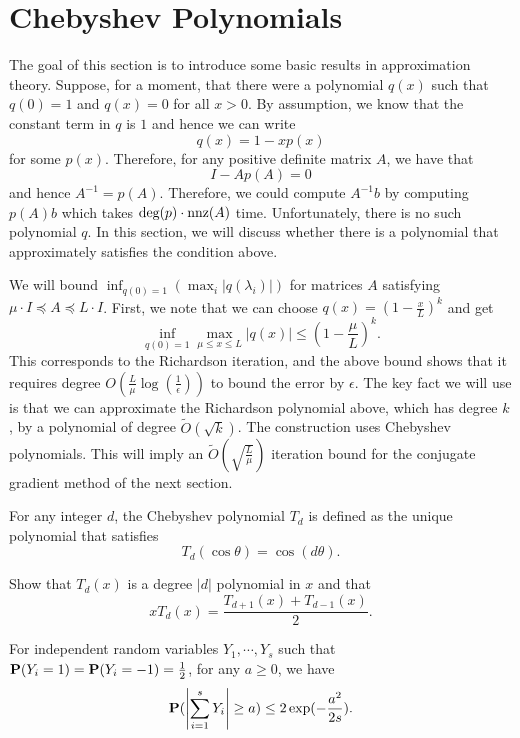 %

\section{Chebyshev Polynomials\label{sec:Chebyshev-Polynomials}}

The goal of this section is to introduce some basic results in approximation
theory. Suppose, for a moment, that there were a polynomial $q(x)$
such that $q(0)=1$ and $q(x)=0$ for all $x>0$. By assumption, we
know that the constant term in $q$ is $1$ and hence we can write
\[
q(x)=1-xp(x)
\]
for some $p(x)$. Therefore, for any positive definite matrix $A$,
we have that
\[
I-Ap(A)=0
\]
and hence $A^{-1}=p(A).$ Therefore, we could compute $A^{-1}b$ by
computing $p(A)b$ which takes $\text{deg}(p)\cdot\nnz(A)$ time.
Unfortunately, there is no such polynomial $q$. In this section,
we will discuss whether there is a polynomial that approximately satisfies
the condition above. 

We will bound $\inf_{q(0)=1}\left(\max_{i}\left|q(\lambda_{i})\right|\right)$
for matrices $A$ satisfying $\mu\cdot I\preceq A\preceq L\cdot I$.
First, we note that we can choose $q(x)=\left(1-\frac{x}{L}\right)^{k}$
and get
\[
\inf_{q(0)=1}\max_{\mu\leq x\leq L}\left|q(x)\right|\leq\left(1-\frac{\mu}{L}\right)^{k}.
\]
This corresponds to the Richardson iteration, and the above bound
shows that it requires degree $O(\frac{L}{\mu}\log(\frac{1}{\epsilon}))$
to bound the error by $\epsilon$. The key fact we will use is that
we can approximate the Richardson polynomial above, which has degree
$k$, by a polynomial of degree $\tilde{O}(\sqrt{k})$. The construction
uses Chebyshev polynomials. This will imply an $\tilde{O}(\sqrt{\frac{L}{\mu}})$
iteration bound for the conjugate gradient method of the next section.
\begin{defn}
For any integer $d$, the Chebyshev polynomial $T_{d}$ is defined
as the unique polynomial that satisfies 
\[
T_{d}(\cos\theta)=\cos(d\theta).
\]
\end{defn}

\begin{xca}
Show that $T_{d}(x)$ is a degree $|d|$ polynomial in $x$ and that
\begin{equation}
xT_{d}(x)=\frac{T_{d+1}(x)+T_{d-1}(x)}{2}.\label{eq:T_avg_recursion}
\end{equation}
\end{xca}

\begin{thm}
\label{thm:chernoff}For independent random variables $Y_{1},\cdots,Y_{s}$
such that $\P(Y_{i}=1)=\P(Y_{i}=-1)=\frac{1}{2}$, for any $a\geq0$,
we have
\[
\P(\left|\sum^{s}_{i=1}Y_{i}\right|\geq a)\leq2\exp(-\frac{a^{2}}{2s}).
\]
\end{thm}


